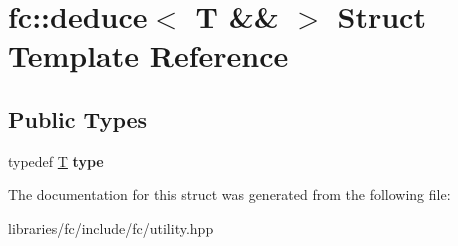 \hypertarget{structfc_1_1deduce_3_01_t_01_6_6_01_4}{}\section{fc\+:\+:deduce$<$ T \&\& $>$ Struct Template Reference}
\label{structfc_1_1deduce_3_01_t_01_6_6_01_4}
\subsection*{Public Types}
\begin{DoxyCompactItemize}
\item 
\mbox{\label{structfc_1_1deduce_3_01_t_01_6_6_01_4_a18c27c07678f658c78c0f7c0a07f5243}} 
typedef \mbox{\hyperlink{struct_t}{T}} {\bfseries type}
\end{DoxyCompactItemize}


The documentation for this struct was generated from the following file\+:\begin{DoxyCompactItemize}
\item 
libraries/fc/include/fc/utility.\+hpp\end{DoxyCompactItemize}

